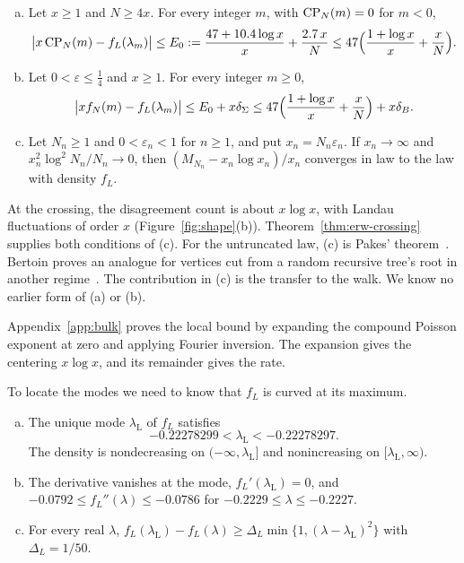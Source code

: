 \begin{theorem}\label{thm:landau}
\begin{enumerate}[(a)]
\item Let $x\ge1$ and $N\ge4x$. For every integer $m$, with $\mathrm{CP}_N(m)=0$ for $m<0$,
\[
 \bigl\lvert x\,\mathrm{CP}_N(m)-f_L(\lambda_m)\bigr\rvert\le E_0:=\frac{47+10.4\log x}x+\frac{2.7\,x}N
 \le47\Bigl(\frac{1+\log x}x+\frac xN\Bigr).
\]
\item Let $0<\varepsilon\le\frac14$ and $x\ge1$. For every integer $m\ge0$,
\[
 \bigl\lvert xf_N(m)-f_L(\lambda_m)\bigr\rvert\le E_0+x\delta_\Sigma
 \le47\Bigl(\frac{1+\log x}x+\frac xN\Bigr)+x\delta_B .
\]
\item Let $N_n\ge1$ and $0<\varepsilon_n<1$ for $n\ge1$, and put $x_n=N_n\varepsilon_n$. If
$x_n\to\infty$ and $x_n^2\log^2N_n/N_n\to0$, then $(M_{N_n}-x_n\log x_n)/x_n$ converges in
law to the law with density $f_L$.
\end{enumerate}
\end{theorem}

At the crossing, the disagreement count is about $x\log x$, with Landau fluctuations of order $x$ (Figure~\ref{fig:shape}(b)). Theorem~\ref{thm:erw-crossing} supplies both conditions of (c).
For the untruncated law, (c) is Pakes' theorem~\cite[p.~993]{pakes1993}.
Bertoin proves an analogue for vertices cut from a random recursive
tree's root in another regime~\cite[Proposition~1]{bertoin2014ejp}.
The contribution in (c) is the transfer to the walk. We know no earlier form of (a) or (b).

Appendix~\ref{app:bulk} proves the local bound by expanding the compound
Poisson exponent at zero and applying Fourier inversion. The expansion
gives the centering $x\log x$, and its remainder gives the rate.

To locate the modes we need to know that $f_L$ is curved at its maximum.

\begin{lemma}\label{lem:landau-mode}
\begin{enumerate}[(a)]
\item The unique mode $\lambda_{\mathrm L}$ of $f_L$ satisfies
\[
 -0.22278299<\lambda_{\mathrm L}<-0.22278297.
\]
The density is nondecreasing on
$(-\infty,\lambda_{\mathrm L}]$ and nonincreasing on $[\lambda_{\mathrm L},\infty)$.
\item The derivative vanishes at the mode, $f_L'(\lambda_{\mathrm L})=0$, and
$-0.0792\le f_L''(\lambda)\le-0.0786$ for
$-0.2229\le\lambda\le-0.2227$.
\item For every real $\lambda$,
$f_L(\lambda_{\mathrm L})-f_L(\lambda)\ge\Delta_L\min\{1,(\lambda-\lambda_{\mathrm L})^2\}$ with
$\Delta_L=1/50$.
\end{enumerate}
\end{lemma}

